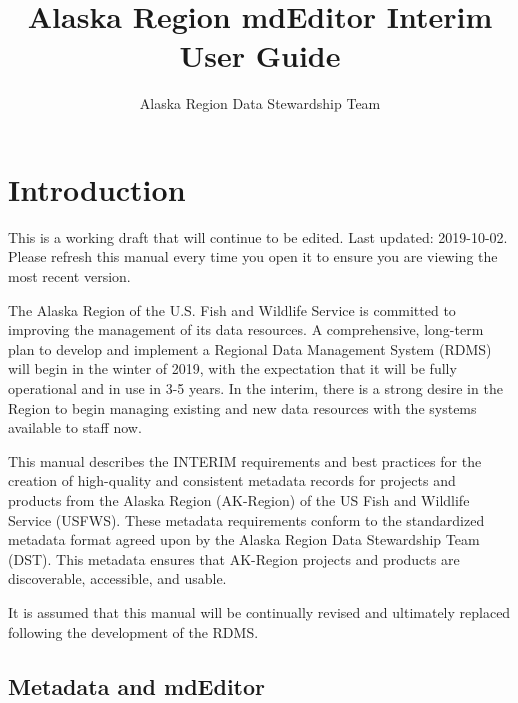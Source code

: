 \documentclass[
]{book}
\title{Alaska Region mdEditor Interim User Guide}
\author{Alaska Region Data Stewardship Team}
\date{}
\makeatletter
\newenvironment{kframe}{%
\medskip{}
\setlength{\fboxsep}{.8em}
 \def\at@end@of@kframe{}%
 \ifinner\ifhmode%
  \def\at@end@of@kframe{\end{minipage}}%
  \begin{minipage}{\columnwidth}%
 \fi\fi%
 \def\FrameCommand##1{\hskip\@totalleftmargin \hskip-\fboxsep
 \colorbox{shadecolor}{##1}\hskip-\fboxsep
     \hskip-\linewidth \hskip-\@totalleftmargin \hskip\columnwidth}%
 \MakeFramed {\advance\hsize-\width
   \@totalleftmargin\z@ \linewidth\hsize
   \@setminipage}}%
 {\par\unskip\endMakeFramed%
 \at@end@of@kframe}
\newenvironment{rmdblock}[1]
  {
  \begin{itemize}
  \renewcommand{\labelitemi}{
    \raisebox{-.7\height}[0pt][0pt]{
      {\setkeys{Gin}{width=3em,keepaspectratio}\texttt{[image: images/\#1]}}
    }
  }
  \setlength{\fboxsep}{1em}
  \begin{kframe}
  \item
  }
  {
  \end{kframe}
  \end{itemize}
  }
\newenvironment{rmdcaution}
  {\begin{rmdblock}{caution}}
  {\end{rmdblock}}
\makeatother
\begin{document}
\maketitle


\thispagestyle{empty}

\setlength{\abovedisplayskip}{-5pt}
\setlength{\abovedisplayshortskip}{-5pt}

{
\setcounter{tocdepth}{1}
\tableofcontents
}
\hypertarget{intro}{%
\chapter*{Introduction}\label{intro}}

\begin{rmdcaution}
This is a working draft that will continue to be edited. Last updated:
2019-10-02. Please refresh this manual every time you open it to ensure
you are viewing the most recent version.
\end{rmdcaution}

The Alaska Region of the U.S. Fish and Wildlife Service is committed to improving the management of its data resources. A comprehensive, long-term plan to develop and implement a Regional Data Management System (RDMS) will begin in the winter of 2019, with the expectation that it will be fully operational and in use in 3-5 years. In the interim, there is a strong desire in the Region to begin managing existing and new data resources with the systems available to staff now.

This manual describes the INTERIM requirements and best practices for the creation of high-quality and consistent metadata records for projects and products from the Alaska Region (AK-Region) of the US Fish and Wildlife Service (USFWS). These metadata requirements conform to the standardized metadata format agreed upon by the Alaska Region Data Stewardship Team (DST). This metadata ensures that AK-Region projects and products are discoverable, accessible, and usable.

It is assumed that this manual will be continually revised and ultimately replaced following the development of the RDMS.

\hypertarget{metadata-and-mdeditor}{%
\section*{Metadata and mdEditor}\label{metadata-and-mdeditor}}
\end{document}
